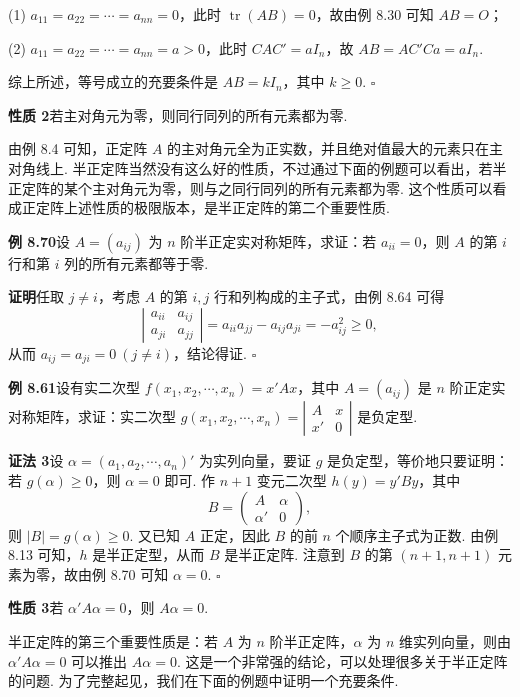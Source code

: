 \documentclass[UTF8, 12pt, fontset=fandol, oneside]{ctexart}
\begin{document}
(1) $a_{11}=a_{22}=\cdots=a_{nn}=0$，此时 $\operatorname{tr}(AB)=0$，故由例 8.30 可知 $AB=O$；

(2) $a_{11}=a_{22}=\cdots=a_{nn}=a>0$，此时 $CAC'=aI_n$，故 $AB=AC'Ca=aI_n$.

综上所述，等号成立的充要条件是 $AB=kI_n$，其中 $k\ge 0$. $\ensuremath{\square}$

\noindent\textbf{性质 2}\quad 若主对角元为零，则同行同列的所有元素都为零.

由例 8.4 可知，正定阵 $A$ 的主对角元全为正实数，并且绝对值最大的元素只在主对角线上. 半正定阵当然没有这么好的性质，不过通过下面的例题可以看出，若半正定阵的某个主对角元为零，则与之同行同列的所有元素都为零. 这个性质可以看成正定阵上述性质的极限版本，是半正定阵的第二个重要性质.

\noindent\textbf{例 8.70}\quad 设 $A=(a_{ij})$ 为 $n$ 阶半正定实对称矩阵，求证：若 $a_{ii}=0$，则 $A$ 的第 $i$ 行和第 $i$ 列的所有元素都等于零.

\noindent\textbf{证明}\quad 任取 $j\ne i$，考虑 $A$ 的第 $i,j$ 行和列构成的主子式，由例 8.64 可得
\[
\left|\begin{array}{cc}
a_{ii} & a_{ij}\\
a_{ji} & a_{jj}
\end{array}\right|
=a_{ii}a_{jj}-a_{ij}a_{ji}=-a_{ij}^2\ge 0,
\]
从而 $a_{ij}=a_{ji}=0\ (j\ne i)$，结论得证. $\ensuremath{\square}$

\noindent\textbf{例 8.61}\quad 设有实二次型 $f(x_1,x_2,\cdots,x_n)=x'Ax$，其中 $A=(a_{ij})$ 是 $n$ 阶正定实对称矩阵，求证：实二次型 $g(x_1,x_2,\cdots,x_n)=\left|\begin{array}{cc}A&x\\ x'&0\end{array}\right|$ 是负定型.

\noindent\textbf{证法 3}\quad 设 $\alpha=(a_1,a_2,\cdots,a_n)'$ 为实列向量，要证 $g$ 是负定型，等价地只要证明：若 $g(\alpha)\ge 0$，则 $\alpha=0$ 即可. 作 $n+1$ 变元二次型 $h(y)=y'By$，其中
\[
B=\left(\begin{array}{cc}
A & \alpha\\
\alpha' & 0
\end{array}\right),
\]
则 $|B|=g(\alpha)\ge 0$. 又已知 $A$ 正定，因此 $B$ 的前 $n$ 个顺序主子式为正数. 由例 8.13 可知，$h$ 是半正定型，从而 $B$ 是半正定阵. 注意到 $B$ 的第 $(n+1,n+1)$ 元素为零，故由例 8.70 可知 $\alpha=0$. $\ensuremath{\square}$

\noindent\textbf{性质 3}\quad 若 $\alpha'A\alpha=0$，则 $A\alpha=0$.

半正定阵的第三个重要性质是：若 $A$ 为 $n$ 阶半正定阵，$\alpha$ 为 $n$ 维实列向量，则由 $\alpha'A\alpha=0$ 可以推出 $A\alpha=0$. 这是一个非常强的结论，可以处理很多关于半正定阵的问题. 为了完整起见，我们在下面的例题中证明一个充要条件.
\end{document}
